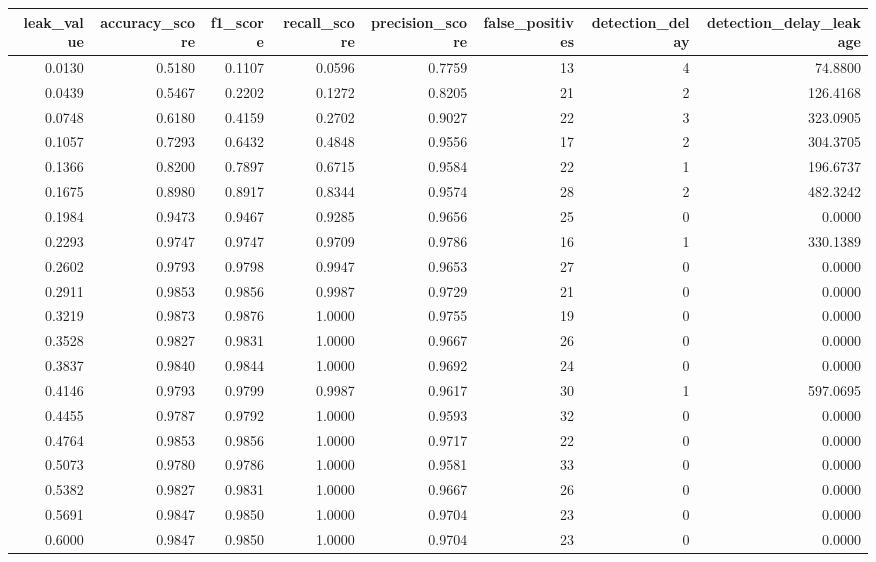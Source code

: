 \begin{tabular}{rrrrrrrr}
\toprule
leak\_value & accuracy\_score & f1\_score & recall\_score & precision\_score & false\_positives & detection\_delay & detection\_delay\_leakage \\
\midrule
0.0130 & 0.5180 & 0.1107 & 0.0596 & 0.7759 & 13 & 4 & 74.8800 \\
0.0439 & 0.5467 & 0.2202 & 0.1272 & 0.8205 & 21 & 2 & 126.4168 \\
0.0748 & 0.6180 & 0.4159 & 0.2702 & 0.9027 & 22 & 3 & 323.0905 \\
0.1057 & 0.7293 & 0.6432 & 0.4848 & 0.9556 & 17 & 2 & 304.3705 \\
0.1366 & 0.8200 & 0.7897 & 0.6715 & 0.9584 & 22 & 1 & 196.6737 \\
0.1675 & 0.8980 & 0.8917 & 0.8344 & 0.9574 & 28 & 2 & 482.3242 \\
0.1984 & 0.9473 & 0.9467 & 0.9285 & 0.9656 & 25 & 0 & 0.0000 \\
0.2293 & 0.9747 & 0.9747 & 0.9709 & 0.9786 & 16 & 1 & 330.1389 \\
0.2602 & 0.9793 & 0.9798 & 0.9947 & 0.9653 & 27 & 0 & 0.0000 \\
0.2911 & 0.9853 & 0.9856 & 0.9987 & 0.9729 & 21 & 0 & 0.0000 \\
0.3219 & 0.9873 & 0.9876 & 1.0000 & 0.9755 & 19 & 0 & 0.0000 \\
0.3528 & 0.9827 & 0.9831 & 1.0000 & 0.9667 & 26 & 0 & 0.0000 \\
0.3837 & 0.9840 & 0.9844 & 1.0000 & 0.9692 & 24 & 0 & 0.0000 \\
0.4146 & 0.9793 & 0.9799 & 0.9987 & 0.9617 & 30 & 1 & 597.0695 \\
0.4455 & 0.9787 & 0.9792 & 1.0000 & 0.9593 & 32 & 0 & 0.0000 \\
0.4764 & 0.9853 & 0.9856 & 1.0000 & 0.9717 & 22 & 0 & 0.0000 \\
0.5073 & 0.9780 & 0.9786 & 1.0000 & 0.9581 & 33 & 0 & 0.0000 \\
0.5382 & 0.9827 & 0.9831 & 1.0000 & 0.9667 & 26 & 0 & 0.0000 \\
0.5691 & 0.9847 & 0.9850 & 1.0000 & 0.9704 & 23 & 0 & 0.0000 \\
0.6000 & 0.9847 & 0.9850 & 1.0000 & 0.9704 & 23 & 0 & 0.0000 \\
\bottomrule
\end{tabular}
